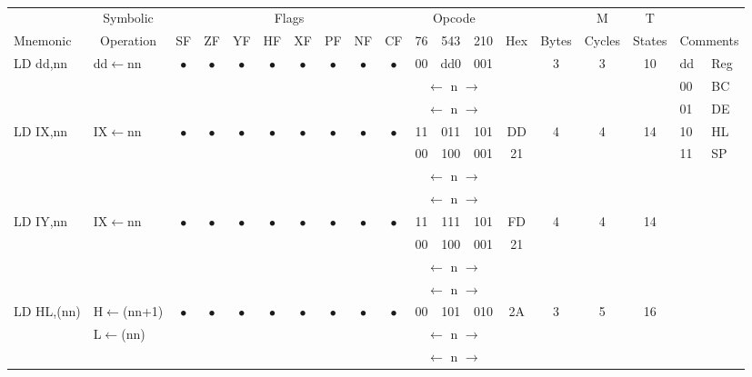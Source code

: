 \documentclass[oneside,a4paper]{book}
\begin{document}
{\tt \scriptsize \setlength{\fboxsep}{0.25mm}
\setlength{\tabcolsep}{1mm}
\begin{tabular}{llc@{ }c@{ }c@{ }c@{ }c@{ }c@{ }c@{ }cc@{ }c@{ }cccccll}\hline
 & \multicolumn{1}{c}{Symbolic} & \multicolumn{8}{c}{Flags} & \multicolumn{3}{c}{Opcode} & & & M & T & \\
Mnemonic & \multicolumn{1}{c}{Operation} & SF & ZF & YF & HF & XF & PF & NF & CF & 76 & 543 & 210 
	& Hex & Bytes & Cycles & States & \multicolumn{2}{l}{Comments} \\ \hline

LD dd,nn & dd$\leftarrow$nn & 
	$\bullet$ & $\bullet$ & $\bullet$ & $\bullet$ & $\bullet$ & $\bullet$ & $\bullet$ & $\bullet$ & 00 & dd0 & 001
	& & 3 & 3 & 10 & dd & Reg\\ \cline{18-19}
\multicolumn{10}{c}{} & \multicolumn{3}{c}{$\leftarrow$ n $\rightarrow$} & \multicolumn{4}{c}{} & 00 & BC\\
\multicolumn{10}{c}{} & \multicolumn{3}{c}{$\leftarrow$ n $\rightarrow$} & \multicolumn{4}{c}{} & 01 & DE\\

LD IX,nn & IX$\leftarrow$nn & 
	$\bullet$ & $\bullet$ & $\bullet$ & $\bullet$ & $\bullet$ & $\bullet$ & $\bullet$ & $\bullet$ & 11 & 011 & 101 
	& DD & 4 & 4 & 14 & 10 & HL\\
\multicolumn{10}{c}{} & 00 & 100 & 001 & 21 & \multicolumn{3}{c}{} & 11 & SP\\
\multicolumn{10}{c}{} & \multicolumn{3}{c}{$\leftarrow$ n $\rightarrow$} & \multicolumn{4}{c}{} & & \\
\multicolumn{10}{c}{} & \multicolumn{3}{c}{$\leftarrow$ n $\rightarrow$} & \multicolumn{4}{c}{} & & \\

LD IY,nn & IX$\leftarrow$nn & 
	$\bullet$ & $\bullet$ & $\bullet$ & $\bullet$ & $\bullet$ & $\bullet$ & $\bullet$ & $\bullet$ & 11 & 111 & 101 
	& FD & 4 & 4 & 14 & & \\
\multicolumn{10}{c}{} & 00 & 100 & 001 & 21 & \multicolumn{3}{c}{} & & \\
\multicolumn{10}{c}{} & \multicolumn{3}{c}{$\leftarrow$ n $\rightarrow$} & \multicolumn{4}{c}{} & & \\
\multicolumn{10}{c}{} & \multicolumn{3}{c}{$\leftarrow$ n $\rightarrow$} & \multicolumn{4}{c}{} & & \\

LD HL,(nn) & H$\leftarrow$(nn+1) &
	$\bullet$ & $\bullet$ & $\bullet$ & $\bullet$ & $\bullet$ & $\bullet$ & $\bullet$ & $\bullet$ & 00 & 101 & 010
	& 2A & 3 & 5 & 16 & & \\ 
           & L$\leftarrow$(nn) & \multicolumn{8}{c}{} & \multicolumn{3}{c}{$\leftarrow$ n $\rightarrow$} & \multicolumn{4}{c}{} & & \\
\multicolumn{10}{c}{} & \multicolumn{3}{c}{$\leftarrow$ n $\rightarrow$} & \multicolumn{4}{c}{} & & \\


\end{tabular}}
\end{document}
